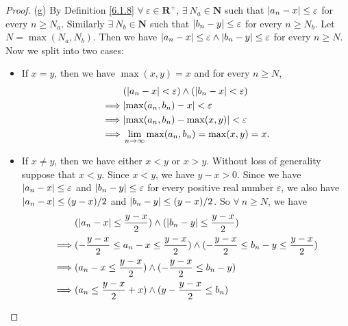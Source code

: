 \begin{proof}{(g)}
    By Definition \ref{6.1.8} \(\forall\ \varepsilon \in \mathbf{R}^+\), \(\exists\ N_a \in \mathbf{N}\) such that \(\abs*{a_n - x} \leq \varepsilon\) for every \(n \geq N_a\).
    Similarly \(\exists\ N_b \in \mathbf{N}\) such that \(\abs*{b_n - y} \leq \varepsilon\) for every \(n \geq N_b\).
    Let \(N = \max(N_a, N_b)\).
    Then we have \(\abs*{a_n - x} \leq \varepsilon \land \abs*{b_n - y} \leq \varepsilon\) for every \(n \geq N\).
    Now we split into two cases:
    \begin{itemize}
        \item If \(x = y\), then we have \(\max(x, y) = x\) and for every \(n \geq N\),
              \begin{align*}
                           & (\abs*{a_n - x} < \varepsilon) \land (\abs*{b_n - x} < \varepsilon) \\
                  \implies & \abs*{\max(a_n, b_n) - x} < \varepsilon                             \\
                  \implies & \abs*{\max(a_n, b_n) - \max(x, y)} < \varepsilon                    \\
                  \implies & \lim_{n \to \infty} \max(a_n, b_n) = \max(x, y) = x.
              \end{align*}
        \item If \(x \neq y\), then we have either \(x < y\) or \(x > y\).
              Without loss of generality suppose that \(x < y\).
              Since \(x < y\), we have \(y - x > 0\).
              Since we have \(\abs*{a_n - x} \leq \varepsilon\) and \(\abs*{b_n - y} \leq \varepsilon\) for every positive real number \(\varepsilon\), we also have \(\abs*{a_n - x} \leq (y - x) / 2\) and \(\abs*{b_n - y} \leq (y - x) / 2\).
              So \(\forall\ n \geq N\), we have
              \begin{align*}
                           & (\abs*{a_n - x} \leq \frac{y - x}{2}) \land (\abs*{b_n - y} \leq \frac{y - x}{2})                               \\
                  \implies & (-\frac{y - x}{2} \leq a_n - x \leq \frac{y - x}{2}) \land (-\frac{y - x}{2} \leq b_n - y \leq \frac{y - x}{2}) \\
                  \implies & (a_n - x \leq \frac{y - x}{2}) \land (-\frac{y - x}{2} \leq b_n - y)                                            \\
                  \implies & (a_n \leq \frac{y - x}{2} + x) \land (y - \frac{y - x}{2} \leq b_n)                                             \\

\end{align*}
\end{itemize}
\end{proof}
